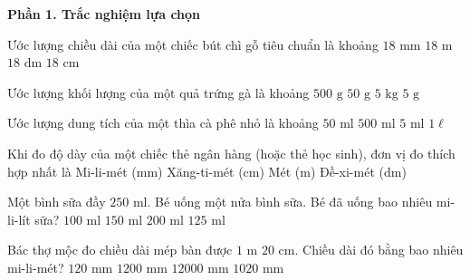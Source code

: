 \textbf{Phần 1. Trắc nghiệm lựa chọn}

\begin{ex} %
Ước lượng chiều dài của một chiếc bút chì gỗ tiêu chuẩn là khoảng
\choice
{$18\text{ mm}$}
{$18\text{ m}$}
{$18\text{ dm}$}
{\True $18\text{ cm}$}
\end{ex}

\begin{ex} %
Ước lượng khối lượng của một quả trứng gà là khoảng
\choice
{$500\text{ g}$}
{\True $50\text{ g}$}
{$5\text{ kg}$}
{$5\text{ g}$}
\end{ex}

\begin{ex} %
Ước lượng dung tích của một thìa cà phê nhỏ là khoảng
\choice
{$50\text{ ml}$}
{$500\text{ ml}$}
{\True $5\text{ ml}$}
{$1\ell$}
\end{ex}

\begin{ex} %
Khi đo độ dày của một chiếc thẻ ngân hàng (hoặc thẻ học sinh), đơn vị đo thích hợp nhất là
\choice
{\True Mi-li-mét ($\text{mm}$)}
{Xăng-ti-mét ($\text{cm}$)}
{Mét ($\text{m}$)}
{Đề-xi-mét ($\text{dm}$)}
\end{ex}

\begin{ex} %
Một bình sữa đầy $250\text{ ml}$. Bé uống một nửa bình sữa. Bé đã uống bao nhiêu mi-li-lít sữa?
\choice
{$100\text{ ml}$}
{$150\text{ ml}$}
{$200\text{ ml}$}
{\True $125\text{ ml}$}
\end{ex}

\begin{ex} %
Bác thợ mộc đo chiều dài mép bàn được $1\text{ m } 20\text{ cm}$. Chiều dài đó bằng bao nhiêu mi-li-mét?
\choice
{$120\text{ mm}$}
{\True $1200\text{ mm}$}
{$12000\text{ mm}$}
{$1020\text{ mm}$}
\end{ex}

